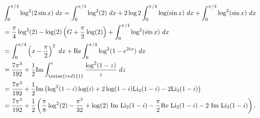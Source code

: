 \begin{align} &\int_{0}^{\pi/4} \log^{2} (2 \sin x) \ dx = \int_{0}^{\pi/4} \log^{2}(2) \ dx + 2 \log 2 \int_{0}^{\pi/4}\log(\sin x) \ dx + \int_{0}^{\pi /4}\log^{2}(\sin x) \ dx \\ &= \frac{\pi}{4} \log^{2}(2) - \log (2) \left(G + \frac{\pi}{2} \log (2) \right) + \int_{0}^{\pi/4} \log^{2}(\sin x) \ dx \\ &= \int_{0}^{\pi /4} \left(x- \frac{\pi}{2} \right)^{2} \ dx + \text{Re} \int_{0}^{\pi/4} \log^{2}(1-e^{2ix}) \ dx \\ &= \frac{7 \pi^{3}}{192} + \frac{1}{2} \text{Im} \int_{{\color{red}{1}}}^{i} \frac{\log^{2}(1-z)}{z} \ dz \\ &= \frac{7 \pi^{3}}{192} + \frac{1}{2} \text{Im} \left(\log^{2}(1-i) \log(i) + 2 \log(1-i) \text{Li}_{2}(1-i) - 2 \text{Li}_{3}(1-i) \right) \\ &= \frac{7 \pi^{3}}{192} + \frac{1}{2} \left(\frac{\pi}{8} \log^{2}(2) - \frac{\pi^{3}}{32} + \log(2)  \ \text{Im} \ \text{Li}_{2}(1-i) - \frac{\pi}{2} \text{Re} \ \text{Li}_{2}(1-i)- 2 \ \text{Im} \ \text{Li}_{3}(1-i)\right) . \end{align}